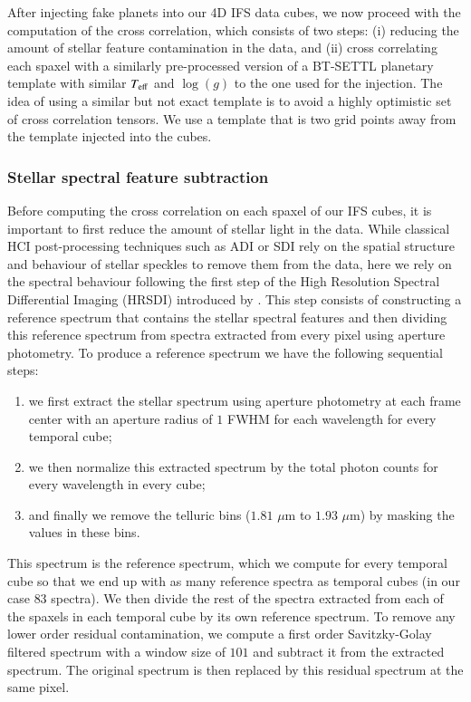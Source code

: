 \documentclass{aa}
\begin{document}
After injecting fake planets into our 4D IFS data cubes, we now proceed with the computation of the cross correlation, which consists of two steps: (i) reducing the amount of stellar feature contamination in the data, and (ii) cross correlating each spaxel with a similarly pre-processed version of a BT-SETTL planetary template with similar $T_{\rm eff}$ and $\log(g)$ to the one used for the injection.
The idea of using a similar but not exact template is to avoid a highly optimistic set of cross correlation tensors.
We use a template that is two grid points away from the template injected into the cubes.

\subsubsection{Stellar spectral feature subtraction}

Before computing the cross correlation on each spaxel of our IFS cubes, it is important to first reduce the amount of stellar light in the data. 
While classical HCI post-processing techniques such as ADI or SDI rely on the spatial structure and behaviour of stellar speckles to remove them from the data, here we rely on the spectral behaviour following the first step of the High Resolution Spectral Differential Imaging (HRSDI) introduced by \citet{2019Haffert}. 
This step consists of constructing a reference spectrum that contains the stellar spectral features and then dividing \citep[or subtracting, in the case of][]{2019Haffert} this reference spectrum from spectra extracted from every pixel using aperture photometry. 
To produce a reference spectrum we have the following sequential steps:
\begin{enumerate}
    \item we first extract the stellar spectrum using aperture photometry at each frame center with an aperture radius of $1$ FWHM for each wavelength for every temporal cube;
    \item we then normalize this extracted spectrum by the total photon counts for every wavelength in every cube;
    \item and finally we remove the telluric bins ($1.81$ $\mu$m to $1.93$ $\mu$m) by masking the values in these bins.
\end{enumerate}
This spectrum is the reference spectrum, which we compute for every temporal cube so that we end up with as many reference spectra as temporal cubes (in our case $83$ spectra).
We then divide the rest of the spectra extracted from each of the spaxels in each temporal cube by its own reference spectrum.
To remove any lower order residual contamination, we compute a first order Savitzky-Golay filtered spectrum with a window size of $101$ and subtract it from the extracted spectrum. The original spectrum is then replaced by this residual spectrum at the same pixel.
\end{document}
